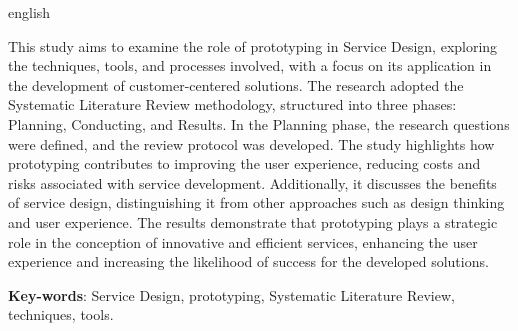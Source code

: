 \begin{resumo}[Abstract]
 \begin{otherlanguage*}{english}
 	
This study aims to examine the role of prototyping in Service Design, exploring the techniques, tools, and processes involved, with a focus on its application in the development of customer-centered solutions. The research adopted the Systematic Literature Review methodology, structured into three phases: Planning, Conducting, and Results. In the Planning phase, the research questions were defined, and the review protocol was developed. The study highlights how prototyping contributes to improving the user experience, reducing costs and risks associated with service development. Additionally, it discusses the benefits of service design, distinguishing it from other approaches such as design thinking and user experience. The results demonstrate that prototyping plays a strategic role in the conception of innovative and efficient services, enhancing the user experience and increasing the likelihood of success for the developed solutions.

   \vspace{\onelineskip}
 
   \noindent 
   \textbf{Key-words}: Service Design, prototyping, Systematic Literature Review, techniques, tools.
 \end{otherlanguage*}
\end{resumo}
